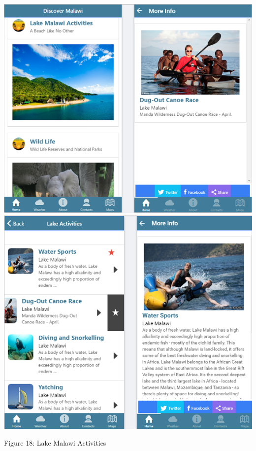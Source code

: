 \begin{center}    
	\includegraphics{img/lakemalawi_info.png}
	\includegraphics{img/lakemalawi.png}
\end{center}
\begin{center}
	Figure 18: Lake Malawi Activities 
\end{center}
\paragraph{}

